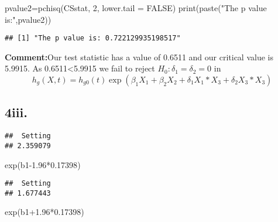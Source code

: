 \documentclass[
]{article}
\newenvironment{Shaded}{\begin{snugshade}}{\end{snugshade}}
\newcommand{\AttributeTok}[1]{\textcolor[rgb]{0.77,0.63,0.00}{#1}}
\newcommand{\CommentTok}[1]{\textcolor[rgb]{0.56,0.35,0.01}{\textit{#1}}}
\newcommand{\ConstantTok}[1]{\textcolor[rgb]{0.00,0.00,0.00}{#1}}
\newcommand{\DecValTok}[1]{\textcolor[rgb]{0.00,0.00,0.81}{#1}}
\newcommand{\FloatTok}[1]{\textcolor[rgb]{0.00,0.00,0.81}{#1}}
\newcommand{\FunctionTok}[1]{\textcolor[rgb]{0.00,0.00,0.00}{#1}}
\newcommand{\NormalTok}[1]{#1}
\newcommand{\OtherTok}[1]{\textcolor[rgb]{0.56,0.35,0.01}{#1}}
\newcommand{\SpecialCharTok}[1]{\textcolor[rgb]{0.00,0.00,0.00}{#1}}
\newcommand{\StringTok}[1]{\textcolor[rgb]{0.31,0.60,0.02}{#1}}
\begin{document}
\begin{Shaded}
\begin{Highlighting}[]
\NormalTok{pvalue2}\OtherTok{=}\FunctionTok{pchisq}\NormalTok{(CSstat, }\DecValTok{2}\NormalTok{, }\AttributeTok{lower.tail =} \ConstantTok{FALSE}\NormalTok{)}
\FunctionTok{print}\NormalTok{(}\FunctionTok{paste}\NormalTok{(}\StringTok{"The p value is:"}\NormalTok{,pvalue2))}
\end{Highlighting}
\end{Shaded}

\begin{verbatim}
## [1] "The p value is: 0.722129935198517"
\end{verbatim}

\textbf{Comment:}Our test statistic has a value of 0.6511 and our
critical value is 5.9915. As 0.6511\textless5.9915 we fail to reject
\(H_0: \delta_1=\delta_2=0\) in \[
h_g(X,t)=h_{g0}(t)\exp(\beta_1 X_1+ \beta_2 X_2 + \delta_1 X_1*X_3 + \delta_2 X_3*X_3)
\]

\hypertarget{iii.}{%
\subsection{4iii.}\label{iii.}}

\begin{Shaded}
\end{Shaded}

\begin{verbatim}
##  Setting 
## 2.359079
\end{verbatim}

\begin{Shaded}
\begin{Highlighting}[]
\FunctionTok{exp}\NormalTok{(b1}\FloatTok{{-}1.96}\SpecialCharTok{*}\FloatTok{0.17398}\NormalTok{)}
\end{Highlighting}
\end{Shaded}

\begin{verbatim}
##  Setting 
## 1.677443
\end{verbatim}

\begin{Shaded}
\begin{Highlighting}[]
\FunctionTok{exp}\NormalTok{(b1}\FloatTok{+1.96}\SpecialCharTok{*}\FloatTok{0.17398}\NormalTok{)}
\end{Highlighting}
\end{Shaded}
\end{document}
